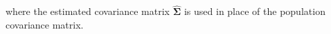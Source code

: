 \noindent where
the estimated covariance matrix
$\hat{\boldsymbol{\Sigma}}$
is used in place of the population covariance matrix.
